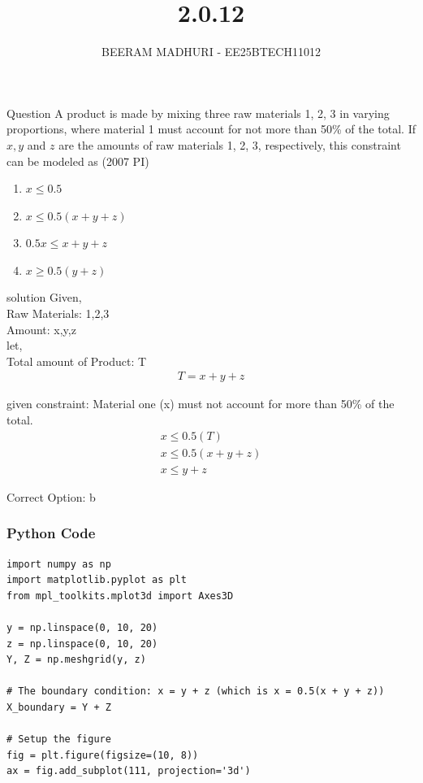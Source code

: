 \documentclass{beamer}
\title %
{2.0.12}
\author %
{BEERAM MADHURI - EE25BTECH11012}
\begin{document}
\frame{\titlepage}
\begin{frame}{Question}
A product is made by mixing three raw materials 1, 2, 3 in varying proportions, where material 1 must account for not more than 50\% of the total. If $x, y$ and $z$ are the amounts of raw materials 1, 2, 3, respectively, this constraint can be modeled as \hfill(2007 PI)

\begin{enumerate}[label=\alph*)]
    \item $x \le 0.5$
    \item $x \le 0.5(x + y + z)$
    \item $0.5x \le x + y + z$
    \item $x \ge 0.5(y + z)$
\end{enumerate}
\end{frame}

\begin{frame}{solution}
Given,\\
Raw Materials: 1,2,3\\
Amount: x,y,z\\
let,\\
Total amount of Product: T\\
\begin{align}
    T = x+y+z
\end{align}
\end{frame}
\begin{frame}
given constraint: Material one (x) must not account for more than 50\% of the total.\\
\begin{align} 
    x \le 0.5(T)\\
    x \le 0.5(x+y+z)\\
    x\le y+z
\end{align}

Correct Option: b
\end{frame}

\begin{frame}[fragile]
    \frametitle{Python Code}
    \begin{lstlisting}
import numpy as np
import matplotlib.pyplot as plt
from mpl_toolkits.mplot3d import Axes3D

y = np.linspace(0, 10, 20)
z = np.linspace(0, 10, 20)
Y, Z = np.meshgrid(y, z)

# The boundary condition: x = y + z (which is x = 0.5(x + y + z))
X_boundary = Y + Z

# Setup the figure
fig = plt.figure(figsize=(10, 8))
ax = fig.add_subplot(111, projection='3d')
\end{lstlisting}
\end{frame}
\end{document}
